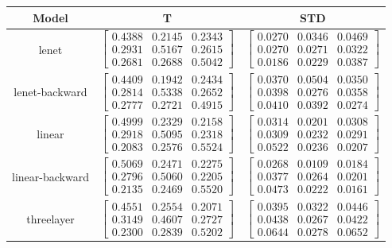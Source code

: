 \documentclass{article} %
\begin{document}
\begin{table}\begin{tabular}{ccc}Model&T&STD\\\hline
lenet & $\begin{bmatrix}0.4388 & 0.2145 & 0.2343\\0.2931 & 0.5167 & 0.2615\\0.2681 & 0.2688 & 0.5042\end{bmatrix}$ & $\begin{bmatrix}0.0270 & 0.0346 & 0.0469\\0.0270 & 0.0271 & 0.0322\\0.0186 & 0.0229 & 0.0387\end{bmatrix}$\\
lenet-backward & $\begin{bmatrix}0.4409 & 0.1942 & 0.2434\\0.2814 & 0.5338 & 0.2652\\0.2777 & 0.2721 & 0.4915\end{bmatrix}$ & $\begin{bmatrix}0.0370 & 0.0504 & 0.0350\\0.0398 & 0.0276 & 0.0358\\0.0410 & 0.0392 & 0.0274\end{bmatrix}$\\
linear & $\begin{bmatrix}0.4999 & 0.2329 & 0.2158\\0.2918 & 0.5095 & 0.2318\\0.2083 & 0.2576 & 0.5524\end{bmatrix}$ & $\begin{bmatrix}0.0314 & 0.0201 & 0.0308\\0.0309 & 0.0232 & 0.0291\\0.0522 & 0.0236 & 0.0207\end{bmatrix}$\\
linear-backward & $\begin{bmatrix}0.5069 & 0.2471 & 0.2275\\0.2796 & 0.5060 & 0.2205\\0.2135 & 0.2469 & 0.5520\end{bmatrix}$ & $\begin{bmatrix}0.0268 & 0.0109 & 0.0184\\0.0377 & 0.0264 & 0.0201\\0.0473 & 0.0222 & 0.0161\end{bmatrix}$\\
threelayer & $\begin{bmatrix}0.4551 & 0.2554 & 0.2071\\0.3149 & 0.4607 & 0.2727\\0.2300 & 0.2839 & 0.5202\end{bmatrix}$ & $\begin{bmatrix}0.0395 & 0.0322 & 0.0446\\0.0438 & 0.0267 & 0.0422\\0.0644 & 0.0278 & 0.0652\end{bmatrix}$\\

\end{tabular}
\end{table}
\end{document}
